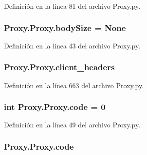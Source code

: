Definición en la línea 81 del archivo Proxy.\-py.

\hypertarget{class_proxy_1_1_proxy_a69cca6a8dc492a7df46430f19598a27b}{
\subsubsection[{body\-Size}]{\setlength{\rightskip}{0pt plus 5cm}Proxy.\-Proxy.\-body\-Size = None\hspace{0.3cm}{\ttfamily [static]}}}\label{class_proxy_1_1_proxy_a69cca6a8dc492a7df46430f19598a27b}


Definición en la línea 43 del archivo Proxy.\-py.

\hypertarget{class_proxy_1_1_proxy_ad923748d196f3f4cc70844214ae70e85}{
\subsubsection[{client\-\_\-headers}]{\setlength{\rightskip}{0pt plus 5cm}Proxy.\-Proxy.\-client\-\_\-headers}}\label{class_proxy_1_1_proxy_ad923748d196f3f4cc70844214ae70e85}


Definición en la línea 663 del archivo Proxy.\-py.

\hypertarget{class_proxy_1_1_proxy_a570ab3ad0617dac2e5f6837f17da9385}{
\subsubsection[{code}]{\setlength{\rightskip}{0pt plus 5cm}int Proxy.\-Proxy.\-code = 0\hspace{0.3cm}{\ttfamily [static]}}}\label{class_proxy_1_1_proxy_a570ab3ad0617dac2e5f6837f17da9385}


Definición en la línea 49 del archivo Proxy.\-py.

\hypertarget{class_proxy_1_1_proxy_a8b14a11476e1a3b851ce385386590bd6}{
\subsubsection[{code}]{\setlength{\rightskip}{0pt plus 5cm}Proxy.\-Proxy.\-code}}\label{class_proxy_1_1_proxy_a8b14a11476e1a3b851ce385386590bd6}


